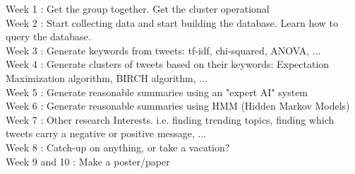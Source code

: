 \documentclass[12pt,a4paper,twoside]{article}
\begin{document}

Week 1 : Get the group together. Get the cluster operational\\


Week 2 : Start collecting data and start building the database. Learn how to query the database.\\


Week 3 : Generate keywords from tweets: tf-idf, chi-squared, ANOVA, ... \\


Week 4 : Generate clusters of tweets based on their keywords: Expectation Maximization algorithm, BIRCH algorithm, ...\\


Week 5 : Generate reasonable summaries using an "expert AI" system\\


Week 6 : Generate reasonable summaries using HMM (Hidden Markov Models)\\


Week 7 : Other research Interests. i.e. finding trending topics, finding which tweets carry a negative or positive message, ...\\


Week 8 : Catch-up on anything, or take a vacation?\\


Week 9 and 10 : Make a poster/paper\\
\end{document}
